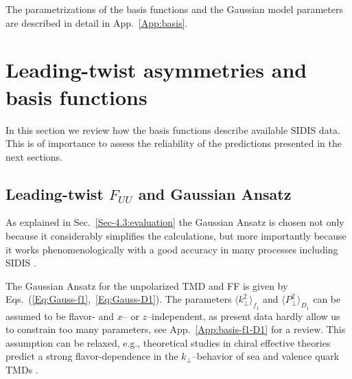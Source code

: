 \documentclass[a4paper,11pt]{article}
\newcommand{\la}{\langle}
\newcommand{\ra}{\rangle}
\def\kperp{k_\perp}
\def\pperp{P_\perp}
\def\avkperp{\la \kperp^2 \ra}
\def\avpperp{\la \pperp^2 \ra}
\begin{document}
The parametrizations of the basis functions and the Gaussian model
parameters are described in detail in App.~\ref{App:basis}.




%
\section{Leading-twist asymmetries and basis functions}
\label{Sec-5:twist-2+basis}
In this section we review how the basis functions describe available
SIDIS data. This is of importance to assess the reliability of the
predictions presented in the next sections.

\subsection{\boldmath Leading-twist $F_{UU}$ and Gaussian Ansatz}
\label{Sec-5.1:FUU-basis}

As explained in Sec.~\ref{Sec-4.3:evaluation} the Gaussian Ansatz is chosen
not only because it considerably simplifies the calculations, but more 
importantly because it works phenomenologically with a good accuracy 
in many processes including SIDIS
\cite{Anselmino:2005nn,Collins:2005ie,D'Alesio:2007jt,Schweitzer:2010tt,
Signori:2013mda,Anselmino:2013lza}.

The Gaussian Ansatz for the unpolarized TMD and FF 
is given by Eqs.~(\ref{Eq:Gauss-f1},~\ref{Eq:Gauss-D1}).
The parameters $\avkperp_{f_1}$ and $\avpperp_{D_1}$ can be 
assumed to be flavor- and $x$-- or $z$--independent, as present
data hardly allow us to constrain too many parameters, see
App.~\ref{App:basis-f1-D1} for a review. This assumption can be
relaxed, e.g., theoretical studies in chiral effective theories 
predict a strong flavor-dependence in the $\kperp$--behavior
of sea and valence quark TMDs \cite{Schweitzer:2012hh}.
\end{document}
